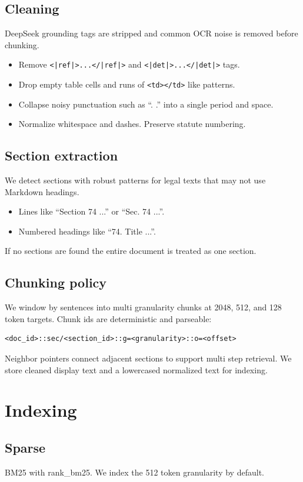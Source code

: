 \documentclass[11pt]{article}
\begin{document}
\subsection{Cleaning}
DeepSeek grounding tags are stripped and common OCR noise is removed before chunking.
\begin{itemize}[leftmargin=1.2em]
  \item Remove \texttt{<|ref|>...</|ref|>} and \texttt{<|det|>...</|det|>} tags.
  \item Drop empty table cells and runs of \texttt{<td></td>} like patterns.
  \item Collapse noisy punctuation such as ``. .'' into a single period and space.
  \item Normalize whitespace and dashes. Preserve statute numbering.
\end{itemize}

\subsection{Section extraction}
We detect sections with robust patterns for legal texts that may not use Markdown headings.
\begin{itemize}[leftmargin=1.2em]
  \item Lines like ``Section 74 ...'' or ``Sec. 74 ...''.
  \item Numbered headings like ``74. Title ...''.
\end{itemize}
If no sections are found the entire document is treated as one section.

\subsection{Chunking policy}
We window by sentences into multi granularity chunks at 2048, 512, and 128 token targets. Chunk ids are deterministic and parseable:
\begin{verbatim}
<doc_id>::sec/<section_id>::g=<granularity>::o=<offset>
\end{verbatim}
Neighbor pointers connect adjacent sections to support multi step retrieval. We store cleaned display text and a lowercased normalized text for indexing.

\section{Indexing}
\subsection{Sparse}
BM25 with rank\_bm25. We index the 512 token granularity by default.
\end{document}
